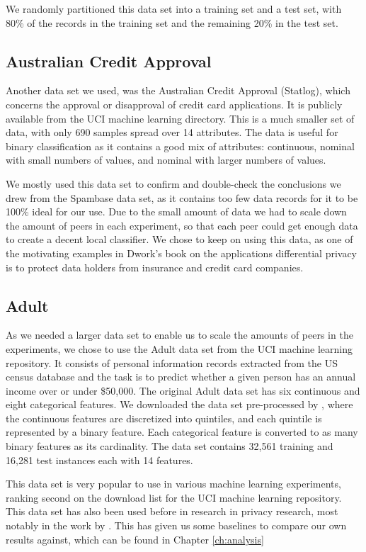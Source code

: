 We randomly partitioned this data set into a training set and a test set, with 80\% of the records in the training set and the remaining 20\% in the test set.

\subsection{Australian Credit Approval}
Another data set we used, was the Australian Credit Approval (Statlog)\citep{australian1987data}, which concerns the approval or disapproval of credit card applications. It is publicly available from the UCI machine learning directory. This is a much smaller set of data, with only 690 samples spread over 14 attributes. The data is useful for binary classification as it contains a good mix of attributes: continuous, nominal with small numbers of values, and nominal with larger numbers of values.

We mostly used this data set to confirm and double-check the conclusions we drew from the Spambase data set, as it contains too few data records for it to be 100\% ideal for our use. Due to the small amount of data we had to scale down the amount of peers in each experiment, so that each peer could get enough data to create a decent local classifier. We chose to keep on using this data, as one of the motivating examples in Dwork's book\citep{dwork2013algorithmic} on the applications differential privacy is to protect data holders from insurance and credit card companies. 


\subsection{Adult}
As we needed a larger data set to enable us to scale the amounts of peers in the experiments, we chose to use the Adult data set from the UCI machine learning repository.  It consists of personal information records extracted from the US census database and the task is to predict whether a given person has an annual income over or under \$50,000. The original Adult data set has six continuous and eight categorical features. We
downloaded the data set pre-processed by \cite{platt1999fast}, where the continuous features are discretized into quintiles, and each quintile is represented by a binary feature. Each categorical feature is converted to as many binary features as its cardinality. The data set contains 32,561 training and 16,281 test instances each with 14 features.

This data set is very popular to use in various machine learning experiments, ranking second on the download list for the UCI machine learning repository. This data set has also been used before in research in privacy research, most notably in the work by \cite{pathak2010diffprivhomo}. This has given us some baselines to compare our own results against, which can be found in Chapter \ref{ch:analysis}

